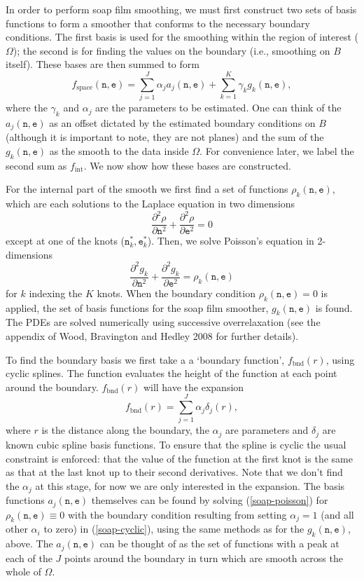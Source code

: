 \documentclass[10pt] {article}
\newcommand{\beq}{\begin{equation}}
\newcommand{\eeq}{\end{equation}}
\theoremstyle{definition}
\theoremstyle{plain}
\begin{document}
In order to perform soap film smoothing, we must first construct two sets of basis functions to form a smoother that conforms to the necessary boundary conditions. The first basis is used for the smoothing within the region of interest ($\Omega$); the second is for finding the values on the boundary (i.e., smoothing on $B$ itself). These bases are then summed to form
\beq
f_\text{space}(\texttt{n},\texttt{e})=\sum_{j=1}^J \alpha_j a_j(\texttt{n},\texttt{e}) + \sum_{k=1}^K \gamma_k g_k(\texttt{n},\texttt{e}),
\eeq
where the $\gamma_k$ and $\alpha_j$ are the parameters to be estimated. One can think of the $a_j(\texttt{n},\texttt{e})$ as an offset dictated by the estimated boundary conditions on $B$ (although it is important to note, they are not planes) and the sum of the $g_k(\texttt{n},\texttt{e})$ as the smooth to the data inside $\Omega$. For convenience later, we label the second sum as $f_\text{int}$. We now show how these bases are constructed.

For the internal part of the smooth we first find a set of functions $\rho_k(\texttt{n},\texttt{e})$, which are each solutions to the Laplace equation in two dimensions
\beq
\frac{\partial^2\rho}{\partial \texttt{n}^2} + \frac{\partial^2\rho}{\partial \texttt{e}^2} = 0
\eeq
except at one of the knots ($\texttt{n}^*_k,\texttt{e}^*_k$). Then, we solve Poisson's equation in 2-dimensions
\beq
\frac{\partial^2 g_k}{\partial \texttt{n}^2} + \frac{\partial^2 g_k}{\partial \texttt{e}^2} = \rho_k(\texttt{n},\texttt{e})
\label{soap-poisson}
\eeq
for $k$ indexing the $K$ knots. When the boundary condition $\rho_k(\texttt{n},\texttt{e})=0$ is applied, the set of basis functions for the soap film smoother, $g_k(\texttt{n},\texttt{e})$ is found.  The PDEs are solved numerically using successive overrelaxation (see the appendix of Wood, Bravington and Hedley 2008 for further details).

To find the boundary basis we first take a a `boundary function', $f_\text{bnd}(r)$, using cyclic splines. The function evaluates the height of the function at each point around the boundary. $f_\text{bnd}(r)$ will have the expansion
\beq
f_\text{bnd}(r)=\sum_{j=1}^J \alpha_j \delta_j(r),
\label{soap-cyclic}
\eeq
where $r$ is the distance along the boundary, the $\alpha_j$ are parameters and $\delta_j$ are known cubic spline basis functions. To ensure that the spline is cyclic the usual constraint is enforced: that the value of the function at the first knot is the same as that at the last knot up to their second derivatives. Note that we don't find the $\alpha_j$ at this stage, for now we are only interested in the expansion. The basis functions $a_j(\texttt{n},\texttt{e})$ themselves can be found by solving (\ref{soap-poisson}) for $\rho_k(\texttt{n},\texttt{e})\equiv 0$ with the boundary condition resulting from setting $\alpha_j=1$ (and all other $\alpha_i$ to zero) in (\ref{soap-cyclic}), using the same methods as for the $g_k(\texttt{n},\texttt{e})$, above. The $a_j(\texttt{n},\texttt{e})$ can be thought of as the set of functions with a peak at each of the $J$ points around the boundary in turn which are smooth across the whole of $\Omega$.
\end{document}
